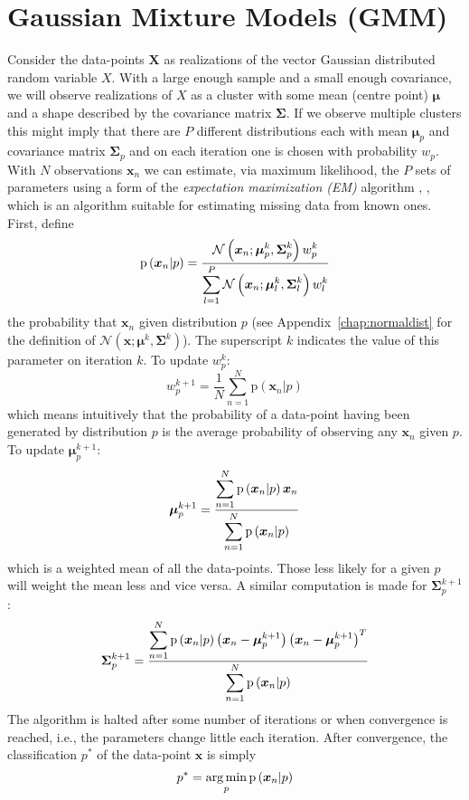 \chapter{Gaussian Mixture Models (GMM) \label{chap:gmm}}

Consider the data-points $\boldsymbol{X}$ as realizations of the vector Gaussian
distributed random variable $X$. With a large enough sample and a small enough
covariance, we will observe realizations of $X$ as a cluster with some mean
(centre point) $\boldsymbol{\mu}$ and a shape described by the covariance matrix
$\boldsymbol{\Sigma}$. If we observe multiple clusters this might imply that
there are $P$ different distributions each with mean $\boldsymbol{\mu}_p$ and
covariance matrix $\boldsymbol{\Sigma}_p$ and on each iteration one is chosen
with probability $w_p$. With $N$ observations $\boldsymbol{x}_{n}$ we can
estimate, via maximum likelihood, the $P$ sets of parameters using a form of the
\textit{expectation maximization (EM)} algorithm \cite{moon1996expectation},
\cite{dempster1977maximum}, which is an algorithm suitable for estimating
missing data from known ones. First, define
\[
    \mathrm{p} \left( \boldsymbol{x}_{n} | p \right)
    =
    \frac{\displaystyle 
        \mathcal{N} \left( \boldsymbol{x}_{n}; \boldsymbol{\mu}^{k}_{p} ,
        \boldsymbol{\Sigma}^{k}_{p} \right) w^{k}_{p}
    }{\displaystyle 
        \sum_{l=1}^{P}
        \mathcal{N} \left( \boldsymbol{x}_{n}; \boldsymbol{\mu}^{k}_{l} ,
        \boldsymbol{\Sigma}^{k}_{l} \right) w^{k}_{l}
    }
\]
the probability that $\boldsymbol{x}_n$ given distribution $p$ (see
Appendix~\ref{chap:normaldist} for the definition of $\mathcal{N} \left(
\boldsymbol{x} ; \boldsymbol{\mu}^{k} , \boldsymbol{\Sigma}^{k} \right)$). The superscript $k$
indicates the value of this parameter on iteration $k$. To update $w^{k}_p$:
\[
    w^{k+1}_p = \frac{1}{N} \sum_{n=1}^{N} \mathrm{p} \left( \boldsymbol{x}_n |
    p \right)
\]
which means intuitively that the probability of a data-point having been
generated by distribution $p$ is the average probability of observing any
$\boldsymbol{x}_n$ given $p$. To update $\boldsymbol{\mu}^{k+1}_p$:
\[
    \boldsymbol{\mu}^{k+1}_p
    =
    \frac{\displaystyle \sum_{n=1}^{N} \mathrm{p} \left( \boldsymbol{x}_n |
    p \right) \boldsymbol{x}_n }{\displaystyle \sum_{n=1}^{N} \mathrm{p} \left( \boldsymbol{x}_n |
    p \right)}
\]
which is a weighted mean of all the data-points. Those less likely for a
given $p$ will weight the mean less and vice versa. A similar computation is
made for $\boldsymbol{\Sigma}^{k+1}_p$:
\[
    \boldsymbol{\Sigma}^{k+1}_p
    =
    \frac{\displaystyle \sum_{n=1}^{N} \mathrm{p} \left( \boldsymbol{x}_n | p \right)
        \left( \boldsymbol{x}_n - \boldsymbol{\mu}^{k+1}_p \right) \left(
        \boldsymbol{x}_n - \boldsymbol{\mu}^{k+1}_p \right)^{T}
    }{\displaystyle 
        \sum_{n=1}^{N} \mathrm{p} \left( \boldsymbol{x}_n | p \right)
    }
\]
The algorithm is halted after some number of iterations or when convergence is
reached, i.e., the parameters change little each iteration. After convergence, the
classification $p^{\ast}$ of the data-point $\boldsymbol{x}$ is simply
\[
    p^{\ast} = \mathop{\rm arg\,min}_{p} \mathrm{p} \left( \boldsymbol{x}_n | p \right)
\]

